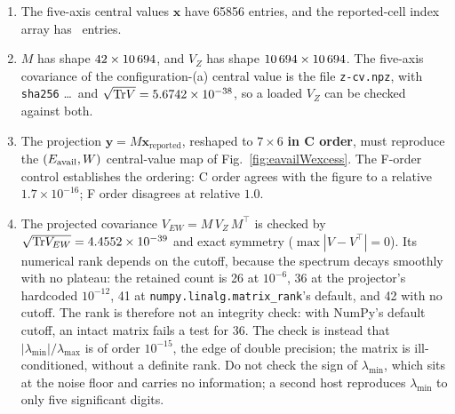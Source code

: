 \begin{enumerate}[itemsep=2pt]
  \item The five-axis central values $\mathbf{x}$ have \num{65856} entries, and the reported-cell index array has \latBins\ entries.
  \item $M$ has shape $42\times10\,694$, and $V_Z$ has shape $10\,694\times10\,694$. The five-axis covariance of the configuration-(a) central value is the file \texttt{z-cv.npz}, with \texttt{sha256} \zcvDigest\ldots\ and $\sqrt{\mathrm{Tr} V}=\SI{5.6742e-38}{}$, so a loaded $V_Z$ can be checked against both.
  \item The projection $\mathbf{y}=M\mathbf{x}_{\text{reported}}$, reshaped to $7\times6$ \textbf{in C order}, must reproduce the $(E_{\mathrm{avail}},W)$ central-value map of Fig.~\ref{fig:eavailWexcess}. The F-order control establishes the ordering: C order agrees with the figure to a relative $1.7\times10^{-16}$; F order disagrees at relative $1.0$.
  \item The projected covariance $V_{EW}=M\,V_Z\,M^{\top}$ is checked by $\sqrt{\mathrm{Tr} V_{EW}}=\SI{4.4552e-39}{}$ and exact symmetry ($\max|V-V^{\top}|=0$). Its numerical rank depends on the cutoff, because the spectrum decays smoothly with no plateau: the retained count is 26 at $10^{-6}$, 36 at the projector's hardcoded $10^{-12}$, 41 at \texttt{numpy.linalg.matrix\_rank}'s default, and 42 with no cutoff. The rank is therefore not an integrity check: with NumPy's default cutoff, an intact matrix fails a test for 36. The check is instead that $|\lambda_{\min}|/\lambda_{\max}$ is of order $10^{-15}$, the edge of double precision; the matrix is ill-conditioned, without a definite rank. Do not check the sign of $\lambda_{\min}$, which sits at the noise floor and carries no information; a second host reproduces $\lambda_{\min}$ to only five significant digits.
\end{enumerate}


